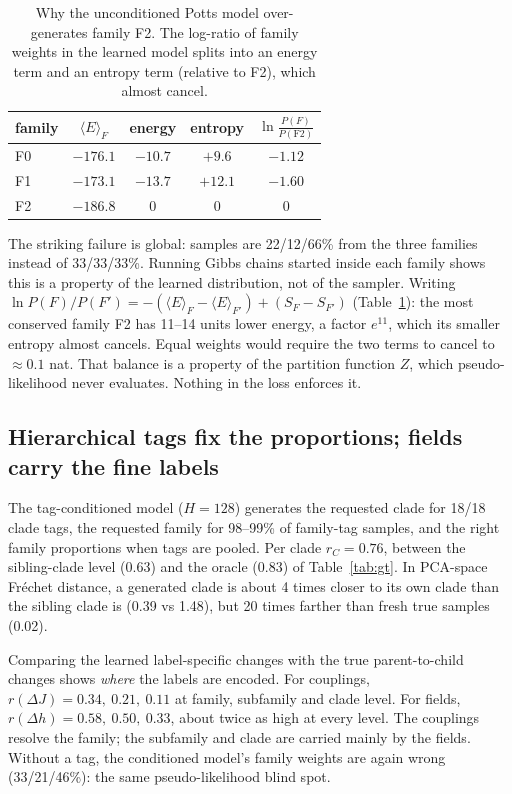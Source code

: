 \documentclass[10pt,a4paper,twocolumn]{article}
\begin{document}
\begin{table}[t]
\centering\small
\begin{tabular}{lcccc}
\toprule
family & $\langle E\rangle_F$ & energy & entropy & $\ln\frac{P(F)}{P(\mathrm{F2})}$\\
\midrule
F0 & $-176.1$ & $-10.7$ & $+9.6$ & $-1.12$\\
F1 & $-173.1$ & $-13.7$ & $+12.1$ & $-1.60$\\
F2 & $-186.8$ & 0 & 0 & 0\\
\bottomrule
\end{tabular}
\caption{Why the unconditioned Potts model over-generates family F2. The log-ratio of family weights in the learned
model splits into an energy term and an entropy term (relative to F2), which almost cancel.}
\label{tab:ee}
\end{table}

The striking failure is global: samples are 22/12/66\% from the three families instead of 33/33/33\%. Running
Gibbs chains started inside each family shows this is a property of the learned distribution, not of the sampler.
Writing $\ln P(F)/P(F')=-(\langle E\rangle_F-\langle E\rangle_{F'})+(S_F-S_{F'})$ (Table~\ref{tab:ee}): the most
conserved family F2 has 11--14 units lower energy, a factor $e^{11}$, which its smaller entropy almost cancels.
Equal weights would require the two terms to cancel to $\approx0.1$ nat. That balance is a property of the partition
function $Z$, which pseudo-likelihood never evaluates. Nothing in the loss enforces it.

\subsection{Hierarchical tags fix the proportions; fields carry the fine labels}
The tag-conditioned model ($H=128$) generates the requested clade for 18/18 clade tags, the requested family for
98--99\% of family-tag samples, and the right family proportions when tags are pooled. Per clade $r_C=0.76$, between
the sibling-clade level (0.63) and the oracle (0.83) of Table~\ref{tab:gt}. In PCA-space Fréchet distance, a
generated clade is about 4 times closer to its own clade than the sibling clade is (0.39 vs 1.48), but 20 times
farther than fresh true samples (0.02).

Comparing the learned label-specific changes with the true parent-to-child changes shows \emph{where} the labels are
encoded. For couplings, $r(\Delta J)=0.34,\ 0.21,\ 0.11$ at family, subfamily and clade level. For fields,
$r(\Delta h)=0.58,\ 0.50,\ 0.33$, about twice as high at every level. The couplings resolve the family; the
subfamily and clade are carried mainly by the fields. Without a tag, the conditioned model's family weights are again
wrong (33/21/46\%): the same pseudo-likelihood blind spot.
\end{document}

